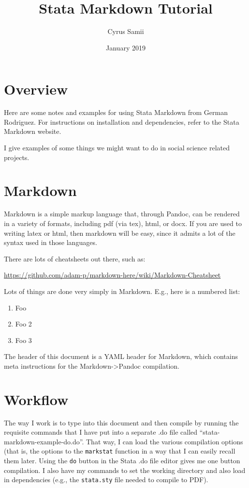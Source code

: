 \documentclass[]{article}
\title{Stata Markdown Tutorial}
\author{Cyrus Samii}
\date{January 2019}
\providecommand{\tightlist}{%
  \setlength{\itemsep}{0pt}\setlength{\parskip}{0pt}}
\begin{document}
\maketitle

\hypertarget{overview}{%
\section{Overview}\label{overview}}

Here are some notes and examples for using Stata Markdown from German
Rodriguez. For instructions on installation and dependencies, refer to
the Stata Markdown website.

I give examples of some things we might want to do in social science
related projects.

\hypertarget{markdown}{%
\section{Markdown}\label{markdown}}

Markdown is a simple markup language that, through Pandoc, can be
rendered in a variety of formats, including pdf (via tex), html, or
docx. If you are used to writing latex or html, then markdown will be
easy, since it admits a lot of the syntax used in those languages.

There are lots of cheatsheets out there, such as:

\url{https://github.com/adam-p/markdown-here/wiki/Markdown-Cheatsheet}

Lots of things are done very simply in Markdown. E.g., here is a
numbered list:

\begin{enumerate}
\def\labelenumi{\arabic{enumi}.}
\tightlist
\item
  Foo
\item
  Foo 2
\item
  Foo 3
\end{enumerate}

The header of this document is a YAML header for Markdown, which
contains meta instructions for the Markdown-\textgreater{}Pandoc
compilation.

\hypertarget{workflow}{%
\section{Workflow}\label{workflow}}

The way I work is to type into this document and then compile by running
the requisite commands that I have put into a separate .do file called
``stata-markdown-example-do.do''. That way, I can load the various
compilation options (that is, the options to the \texttt{markstat}
function in a way that I can easily recall them later. Using the
\texttt{do} button in the Stata .do file editor gives me one button
compilation. I also have my commands to set the working directory and
also load in dependencies (e.g., the \texttt{stata.sty} file needed to
compile to PDF).
\end{document}
